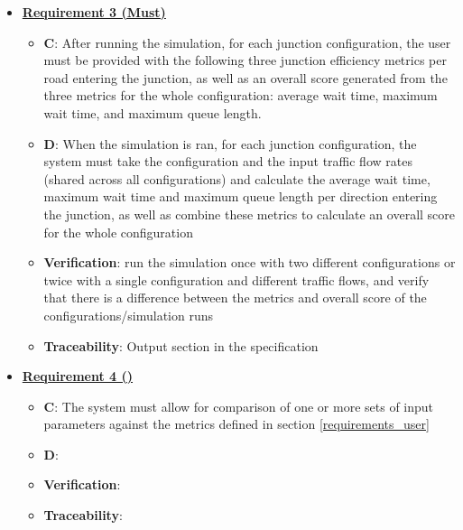 \documentclass{article}
\begin{document}
\begin{itemize}
    \item \textbf{\underline{Requirement 3 (Must)}}
    \begin{itemize}
        \item \textbf{C}: After running the simulation, for each junction configuration, 
            the user must be provided with the following three junction efficiency metrics 
            per road entering the junction, as well as an overall score generated from the 
            three metrics for the whole configuration: average wait time, maximum wait time, 
            and maximum queue length.
        \item \textbf{D}: When the simulation is ran, for each junction configuration, the system 
            must take the configuration and the input traffic flow rates (shared across all 
            configurations) and calculate the average wait time, maximum wait time and 
            maximum queue length per direction entering the junction, as well as combine 
            these metrics to calculate an overall score for the whole configuration
        \item \textbf{Verification}: run the simulation once with two different configurations 
            or twice with a single configuration and different traffic flows, and verify 
            that there is a difference between the metrics and overall score of the 
            configurations/simulation runs
        \item\textbf{Traceability}: Output section in the specification
    \end{itemize}

    \item \textbf{\underline{Requirement 4 ()}}
    \begin{itemize}
        \item \textbf{C}: The system must allow for comparison of one or more sets of input parameters 
            against the metrics defined in section \ref{requirements_user}
        \item \textbf{D}:
        \item \textbf{Verification}:
        \item\textbf{Traceability}:
    \end{itemize}


\end{itemize}
\end{document}
